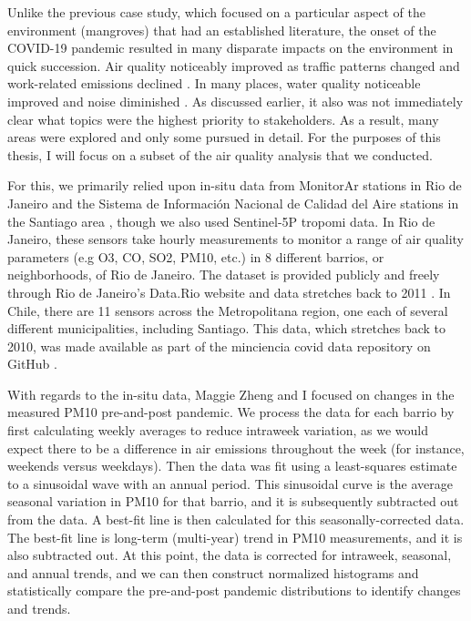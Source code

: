Unlike the previous case study, which focused on a particular aspect of the environment (mangroves) that had an established literature, the onset of the COVID-19 pandemic resulted in many disparate impacts on the environment in quick succession. Air quality noticeably improved as traffic patterns changed and work-related emissions declined \cite{isaifanDramaticImpactCoronavirus2020}. In many places, water quality noticeable improved and noise diminished \cite{aroraCoronavirusLockdownHelped2020}. As discussed earlier, it also was not immediately clear what topics were the highest priority to stakeholders. As a result, many areas were explored and only some pursued in detail. For the purposes of this thesis, I will focus on a subset of the air quality analysis that we conducted.

For this, we primarily relied upon in-situ data from MonitorAr stations in Rio de Janeiro  and the Sistema de Información Nacional de Calidad del Aire stations in the Santiago area , though we also used Sentinel-5P \ac{tropomi} data. In Rio de Janeiro, these sensors take hourly measurements to monitor a range of air quality parameters (e.g O3, CO, SO2, PM10, etc.) in 8 different barrios, or neighborhoods, of Rio de Janeiro. The dataset is provided publicly and freely through Rio de Janeiro's Data.Rio website and data stretches back to 2011 \cite{institutopereirapassosDadosHorariosMonitoramento2018}. In Chile, there are  11 sensors across the Metropolitana region, one each of several different municipalities, including Santiago. This data, which stretches back to 2010, was made available as part of the \ac{minciencia} \ac{covid} data repository on GitHub \cite{ministeriodecienciatecnologiaconocimientoeinnovacionDatosCOVID192021}.

With regards to the in-situ data, Maggie Zheng and I focused on changes in the measured PM10 pre-and-post pandemic. We process the data for each barrio by first calculating weekly averages to reduce intraweek variation, as we would expect there to be a difference in air emissions throughout the week (for instance, weekends versus weekdays). Then the data was fit using a least-squares estimate to a sinusoidal wave with an annual period. This sinusoidal curve is the average seasonal variation in PM10 for that barrio, and it is subsequently subtracted out from the data. A best-fit line is then calculated for this seasonally-corrected data. The best-fit line is long-term (multi-year) trend in PM10 measurements, and it is also subtracted out. At this point, the data is corrected for intraweek, seasonal, and annual trends, and we can then construct normalized histograms and statistically compare the pre-and-post pandemic distributions to identify changes and trends. 

